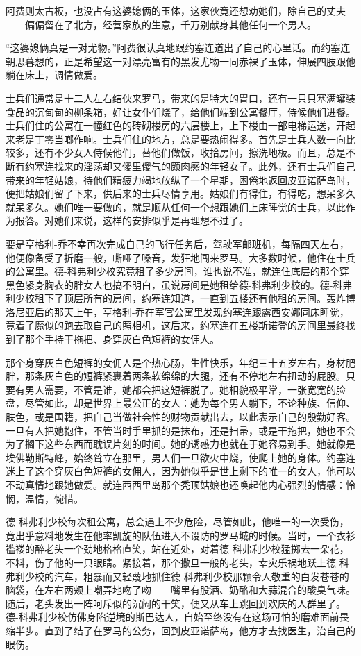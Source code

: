     阿费则太古板，也没占有这婆媳俩的玉体，这家伙竟还想劝她们，除自己的丈夫——偏偏留在了北方，经营家族的生意，千万别献身其他任何一个男人。

    “这婆媳俩真是一对尤物。”阿费很认真地跟约塞连道出了自己的心里话。而约塞连朝思暮想的，正是希望这一对漂亮富有的黑发尤物一同赤裸了玉体，伸展四肢跟他躺在床上，调情做爱。

    士兵们通常是十二人左右结伙来罗马，带来的是特大的胃口，还有一只只塞满罐装食品的沉甸甸的柳条箱，好让女仆们烧了，给他们端到公寓餐厅，侍候他们进餐。士兵们住的公寓在一幢红色的砖砌楼房的六层楼上，上下楼由一部电梯运送，开起来老是丁零当啷作响。士兵们住的地方，总是要热闹得多。首先是士兵人数一向比较多，还有不少女人侍候他们，替他们做饭，收拾房间，擦洗地板。而且，总是不断有约塞连找来的淫荡却又傻里傻气的颇肉感的年轻女子。此外，还有士兵们自己带来的年轻姑娘，待他们精疲力竭地放纵了一个星期，困倦地返回皮亚诺萨岛时，便把姑娘们留了下来，供后来的士兵尽情享用。姑娘们有得住，有得吃，想呆多久就呆多久。她们唯一要做的，就是顺从任何一个想跟她们上床睡觉的士兵，以此作为报答。对她们来说，这样的安排似乎是再理想不过了。

 


    要是亨格利-乔不幸再次完成自己的飞行任务后，驾驶军邮班机，每隔四天左右，他便像备受了折磨一般，嘶哑了嗓音，发狂地闯来罗马。大多数时候，他住在士兵的公寓里。德-科弗利少校究竟租了多少房间，谁也说不准，就连住底层的那个穿黑色紧身胸衣的胖女人也搞不明白，虽说房间是她租给德-科弗利少校的。德-科弗利少校租下了顶层所有的房间，约塞连知道，一直到五楼还有他租的房间。轰炸博洛尼亚后的那天上午，亨格利-乔在军官公寓里发现约塞连跟露西安娜同床睡觉，竟着了魔似的跑去取自己的照相机，这后来，约塞连在五楼斯诺登的房间里最终找到了那个手持干拖把、身穿灰白色短裤的女佣人。

    那个身穿灰白色短裤的女佣人是个热心肠，生性快乐，年纪三十五岁左右，身材肥胖，那条灰白色的短裤紧裹着两条软绵绵的大腿，还有不停地左右扭动的屁股。只要有男人需要，不管是谁，她都会把这短裤脱了。她相貌极平常，一张宽宽的脸盘，尽管如此，却是世界上最公正的女人：她为每个男人躺下，不论种族、信仰、肤色，或是国籍，把自己当做社会性的财物贡献出去，以此表示自己的殷勤好客。一旦有人把她抱住，不管当时手里抓的是抹布，还是扫帚，或是干拖把，她也不会为了搁下这些东西而耽误片刻的时间。她的诱惑力也就在于她容易到手。她就像是埃佛勒斯特峰，始终耸立在那里，男人们一旦欲火中烧，使爬上她的身体。约塞连迷上了这个穿灰白色短裤的女佣人，因为她似乎是世上剩下的唯一的女人，他可以不动真情地跟她做爱。就连西西里岛那个秃顶姑娘也还唤起他内心强烈的情感：怜悯，温情，惋惜。

 


    德-科弗利少校每次租公寓，总会遇上不少危险，尽管如此，他唯一的一次受伤，竟出乎意料地发生在他率凯旋的队伍进入不设防的罗马城的时候。当时，一个衣衫褴褛的醉老头一个劲地格格直笑，站在近处，对着德-科弗利少校猛掷去一朵花，不料，伤了他的一只眼睛。紧接着，那个撒旦一般的老头，幸灾乐祸地跃上德-科弗利少校的汽车，粗暴而又轻蔑地抓住德-科弗利少校那颗令人敬重的白发苍苍的脑袋，在左右两颊上嘲弄地吻了吻——嘴里有股酒、奶酪和大蒜混合的酸臭气味。随后，老头发出一阵呵斥似的沉闷的干笑，便又从车上跳回到欢庆的人群里了。德-科弗利少校仿佛身陷逆境的斯巴达人，自始至终没有在这场可怕的磨难面前畏缩半步。直到了结了在罗马的公务，回到皮亚诺萨岛，他方才去找医生，治自己的眼伤。

